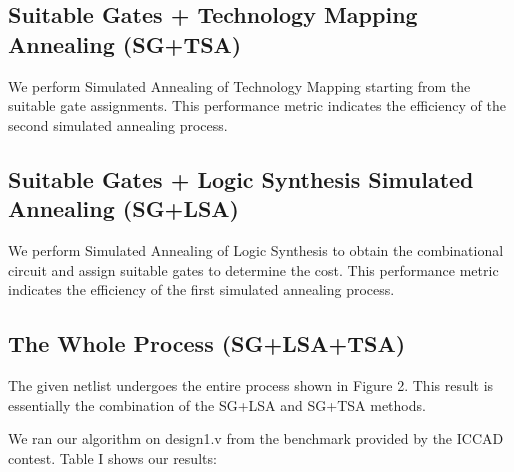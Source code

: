 \documentclass[conference]{IEEEtran}
\begin{document}
\subsection{Suitable Gates + Technology Mapping Annealing (SG+TSA)}
We perform Simulated Annealing of Technology Mapping starting from the suitable gate assignments. This performance metric indicates the efficiency of the second simulated annealing process.

\subsection{Suitable Gates + Logic Synthesis Simulated Annealing (SG+LSA)}
We perform Simulated Annealing of Logic Synthesis to obtain the combinational circuit and assign suitable gates to determine the cost. This performance metric indicates the efficiency of the first simulated annealing process.

\subsection{The Whole Process (SG+LSA+TSA)}
The given netlist undergoes the entire process shown in Figure 2. This result is essentially the combination of the SG+LSA and SG+TSA methods.

We ran our algorithm on design1.v from the benchmark provided by the ICCAD contest. Table I shows our results:
\end{document}
